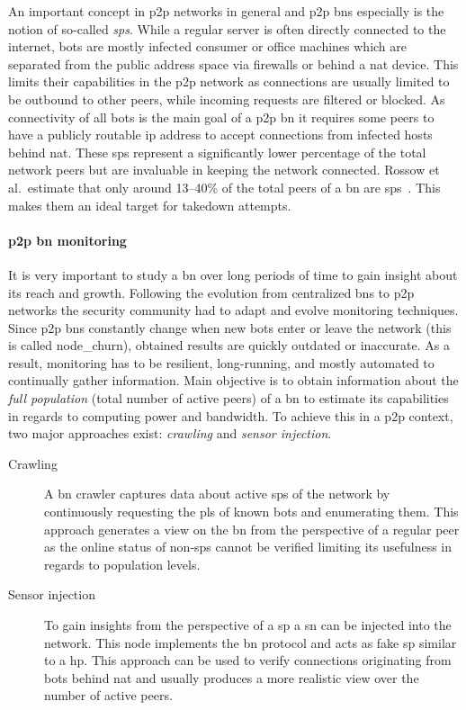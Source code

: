 An important concept in \gls{p2p} networks in general and \gls{p2p} \glspl{bn} especially is the notion of so-called \emph{\glspl{sp}}.
While a regular server is often directly connected to the internet, \glspl{bot} are mostly infected consumer or office machines which are separated from the public address space via firewalls or behind a \gls{nat} device.
This limits their capabilities in the \gls{p2p} network as connections are usually limited to be outbound to other peers, while incoming requests are filtered or blocked.
As connectivity of all \glspl{bot} is the main goal of a \gls{p2p} \gls{bn} it requires some peers to have a publicly routable \gls{ip} address to accept connections from infected hosts behind \gls{nat}.
These \glspl{sp} represent a significantly lower percentage of the total network peers but are invaluable in keeping the network connected.
Rossow et al.\ estimate that only around 13--40\% of the total peers of a \gls{bn} are \glspl{sp}~\cite{rossow2013sok}.
This makes them an ideal target for takedown attempts.


\paragraph*{\gls{p2p} \gls{bn} monitoring}
It is very important to study a \gls{bn} over long periods of time to gain insight about its reach and growth.
Following the evolution from centralized \glspl{bn} to \gls{p2p} networks the security community had to adapt and evolve monitoring techniques.
Since \gls{p2p} \glspl{bn} constantly change when new \glspl{bot} enter or leave the network (this is called \gls{node_churn}), obtained results are quickly outdated or inaccurate.
As a result, monitoring has to be resilient, long-running, and mostly automated to continually gather information.
Main objective is to obtain information about the \emph{full population} (total number of active peers) of a \gls{bn} to estimate its capabilities in regards to computing power and bandwidth.
To achieve this in a \gls{p2p} context, two major approaches exist: \emph{crawling} and \emph{sensor injection}.
\begin{description}
    \item[Crawling]
    A \gls{bn} \gls{crawler} captures data about active \glspl{sp} of the network by continuously requesting the \glspl{pl} of known \glspl{bot} and enumerating them.
    This approach generates a view on the \gls{bn} from the perspective of a regular peer as the online status of non-\glspl{sp} cannot be verified limiting its usefulness in regards to population levels.
    \item[Sensor injection]
    To gain insights from the perspective of a \gls{sp} a \gls{sn} can be injected into the network.
    This node implements the \gls{bn} protocol and acts as fake \gls{sp} similar to a \gls{hp}.
    This approach can be used to verify connections originating from \glspl{bot} behind \gls{nat} and usually produces a more realistic view over the number of active peers.
\end{description}

